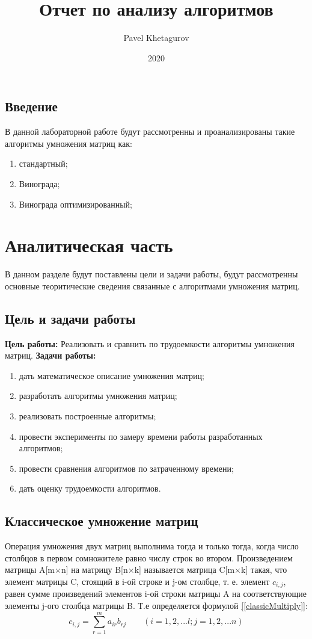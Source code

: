 \documentclass{article}
\title{Отчет по анализу алгоритмов}
\date{2020}
\author{Pavel Khetagurov}
\begin{document}
	
	\newpage
	\tableofcontents
	\newpage
	\begin{center}
	    \section*{Введение}
	\end{center}
		В данной лабораторной работе будут рассмотренны и проанализированы такие алгоритмы умножения матриц как:
		\begin{enumerate}
		\item стандартный;
		\item Винограда;
		\item Винограда оптимизированный;
		\end{enumerate}
	\newpage
	\section{Аналитическая часть}
	В данном разделе будут поставлены цели и задачи работы, будут рассмотренны основные теоритические сведения связанные с алгоритмами умножения матриц.
		\subsection{Цель и задачи работы}
			\textbf{Цель работы:}
			\newline
			Реализовать и сравнить по трудоемкости алгоритмы умножения матриц.
			\newline 
			\indent \textbf{Задачи работы:}
			\begin{enumerate}
				\item дать математическое описание умножения матриц;
				\item разработать алгоритмы умножения матриц;
				\item реализовать построенные алгоритмы;
				\item провести эксперименты по замеру времени работы разработанных алгоритмов;
				\item провести сравнения алгоритмов по затраченному времени;
				\item дать оценку трудоемкости алгоритмов.
			\end{enumerate}
		\subsection{Классическое умножение матриц}
		Операция умножения двух матриц выполнима тогда и только тогда, когда число
столбцов в первом сомножителе равно числу строк во втором.
\newline
\indent				Произведением матрицы A[m×n] на матрицу B[n×k] называется матрица C[m×k] такая,
			что элемент матрицы C, стоящий в i-ой строке и j-ом столбце, т. е. элемент $c_{i,j}$, равен сумме
			произведений элементов i-ой строки матрицы A на соответствующие элементы j-ого столбца
матрицы B. Т.е определяется формулой \hyperref[classicMultiply]{[\ref{classicMultiply}]}:
			\begin{equation}\label{classicMultiply}
			c_{i,j} = \sum_{r=1}^{m}a_{ir}b_{rj} \qquad (i=1,2,...l; j = 1,2,...n)
			 \end{equation}
\end{document}
